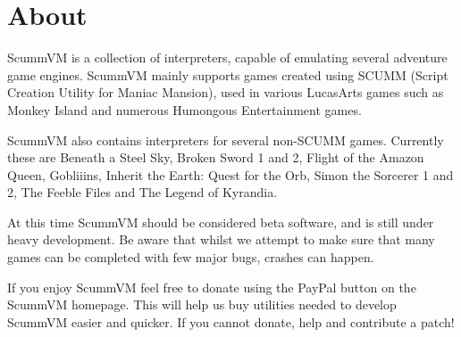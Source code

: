 \section{About}

ScummVM is a collection of interpreters, capable of emulating several
adventure game engines. ScummVM mainly supports games created using
SCUMM (Script Creation Utility for Maniac Mansion), used in various
LucasArts games such as Monkey Island and numerous Humongous Entertainment
games.

ScummVM also contains interpreters for several non-SCUMM games. Currently
these are Beneath a Steel Sky, Broken Sword 1 and 2, Flight of the
Amazon Queen, Gobliiins, Inherit the Earth: Quest for the Orb,
Simon the Sorcerer 1 and 2, The Feeble Files and The Legend of Kyrandia.

At this time ScummVM should be considered beta software, and is still
under heavy development. Be aware that whilst we attempt to make sure
that many games can be completed with few major bugs, crashes can happen.

If you enjoy ScummVM feel free to donate using the PayPal button on the
ScummVM homepage. This will help us buy utilities needed to develop ScummVM
easier and quicker. If you cannot donate, help and contribute a patch!


